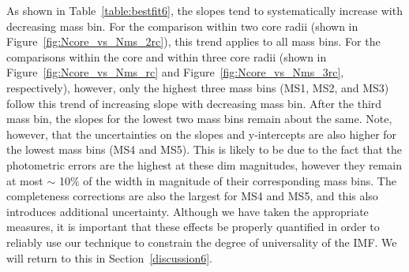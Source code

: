 \begin{table}
\begin{tabular}{|l|cccc|cccc|cccc|cccc|cccc|}
\hline
\end{tabular}
\end{table}

As shown in Table~\ref{table:bestfit6}, the slopes tend to
systematically increase 
with decreasing mass bin.  For the comparison within two core radii
(shown in Figure~\ref{fig:Ncore_vs_Nms_2rc}), 
this trend applies to all mass bins.  For the comparisons within the core
and within three core radii (shown in Figure~\ref{fig:Ncore_vs_Nms_rc}
and Figure~\ref{fig:Ncore_vs_Nms_3rc}, respectively), however, only
the highest three mass bins (MS1, MS2, and MS3) 
follow this trend of increasing slope with decreasing mass bin.  After
the third mass bin, the slopes for the lowest two mass bins remain
about the same.  Note, however, that the uncertainties on the slopes
and y-intercepts are also higher for the lowest mass bins (MS4 and MS5).  
%
This is
likely to be due to the fact that the photometric errors are the
highest at these dim magnitudes, however they remain at most $\sim$
10\% of the width in magnitude of their corresponding mass bins.  The
completeness corrections are also the largest for MS4 and MS5,
and this also introduces additional uncertainty.  Although we have
taken the appropriate measures, it
is important that these effects be properly quantified in order to reliably
use our technique to constrain the degree of universality of the IMF.
We will return to this in Section~\ref{discussion6}.  

